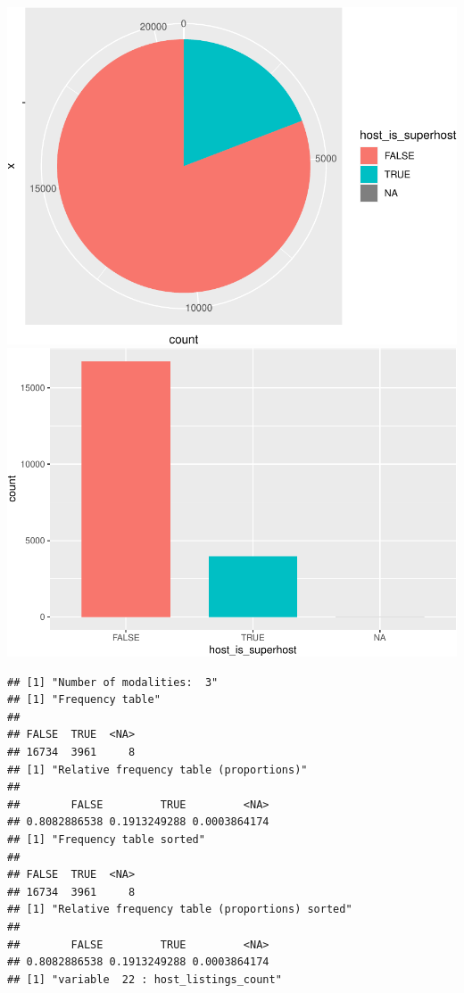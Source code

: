 \includegraphics{anal_files/figure-latex/unnamed-chunk-9-4.pdf}
\includegraphics{anal_files/figure-latex/unnamed-chunk-9-5.pdf}

\begin{verbatim}
## [1] "Number of modalities:  3"
## [1] "Frequency table"
## 
## FALSE  TRUE  <NA> 
## 16734  3961     8 
## [1] "Relative frequency table (proportions)"
## 
##        FALSE         TRUE         <NA> 
## 0.8082886538 0.1913249288 0.0003864174 
## [1] "Frequency table sorted"
## 
## FALSE  TRUE  <NA> 
## 16734  3961     8 
## [1] "Relative frequency table (proportions) sorted"
## 
##        FALSE         TRUE         <NA> 
## 0.8082886538 0.1913249288 0.0003864174 
## [1] "variable  22 : host_listings_count"
\end{verbatim}


